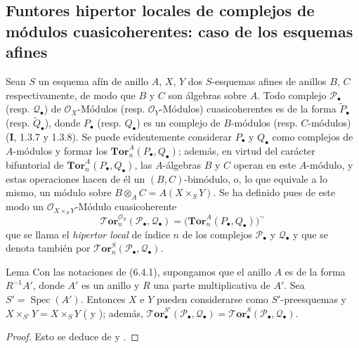 \subsection{Funtores hipertor locales de complejos de módulos cuasicoherentes: caso de los esquemas afines}
\label{subsection:III.6.4}
\label{III.6.4}

\begin{env}[6.4.1]
Sean $S$ un esquema afín de anillo $A$, $X$, $Y$ dos $S$-esquemas afines
de anillos $B$, $C$ respectivamente, de modo que $B$ y $C$ son álgebras
sobre $A$. Todo complejo $\mathscr P_\bullet$ (resp. $\mathscr Q_\bullet$) de
$\mathscr O_X$-Módulos (resp. $\mathscr O_Y$-Módulos) cuasicoherentes es de
la forma $\widetilde{P}_\bullet$ (resp. $\widetilde{Q}_\bullet$), donde
$P_\bullet$ (resp. $Q_\bullet$) es un complejo de $B$-módulos (resp.
$C$-módulos) (\textbf{I}, 1.3.7 y 1.3.8). Se puede evidentemente considerar $P_\bullet$
y $Q_\bullet$ como complejos de $A$-módulos y formar los
$\mathbf{Tor}_n^A(P_\bullet,Q_\bullet)$; además, en virtud del carácter
bifuntorial de $\mathbf{Tor}_n^A(P_\bullet,Q_\bullet)$, las $A$-álgebras
$B$ y $C$ operan en este $A$-módulo, y estas operaciones hacen de él un
$(B,C)$-bimódulo, o, lo que equivale a lo mismo, un módulo sobre
$B\otimes_A C=A(X\times_S Y)$. Se ha definido pues de este modo un
$\mathscr O_{X\times_S Y}$-Módulo cuasicoherente
\[
  \boldsymbol{\mathscr{T}\!or}_n^{\mathscr O_S}(\mathscr P_\bullet,\mathscr Q_\bullet)
  =\bigl(\mathbf{Tor}_n^A(P_\bullet,Q_\bullet)\bigr)^{\sim}
  \tag{6.4.1.1}\label{III.6.4.1.1.fr}
\]
que se llama el \emph{hipertor local} de índice $n$ de los complejos
$\mathscr P_\bullet$ y $\mathscr Q_\bullet$ y que se denota también por
$\boldsymbol{\mathscr{T}\!or}_n^S(\mathscr P_\bullet,\mathscr Q_\bullet)$.
\end{env}

\begin{namedtheorem}[6.4.2]{Lema}
Con las notaciones de \textup{(6.4.1)}, supongamos que el anillo $A$ es de la forma
$R^{-1}A'$, donde $A'$ es un anillo y $R$ una parte
multiplicativa de $A'$. Sea $S'=\operatorname{Spec}(A')$. Entonces $X$ e $Y$
pueden considerarse como $S'$-preesquemas y
$X\times_{S'}Y=X\times_S Y$
\textup{(} y \textup{)}; además,
$\boldsymbol{\mathscr{T}\!or}_\bullet^{S'}(\mathscr P_\bullet,\mathscr Q_\bullet)
=\boldsymbol{\mathscr{T}\!or}_\bullet^S(\mathscr P_\bullet,\mathscr Q_\bullet)$.
\end{namedtheorem}

\begin{proof}
Esto se deduce de  y .
\end{proof}

